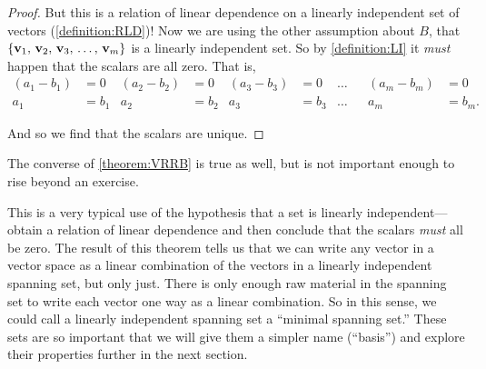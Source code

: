 \documentclass{ximera}
\begin{document}
\begin{theorem}
\begin{proof}
    But this is a relation of linear dependence on a linearly
    independent set of vectors (\ref{definition:RLD})! Now we are
    using the other assumption about $B$, that $\{\mathbf{v}_{1},\,\mathbf{v}_{2},\,\mathbf{v}_{3},\,\ldots,\,\mathbf{v}_{m}\}$
    is a linearly independent set.  So by \ref{definition:LI} it
    \textit{must} happen that the scalars are all zero.  That is,
    \begin{align*}
      (a_1-b_1)&=0&(a_2-b_2)&=0&(a_3-b_3)&=0&\ldots&&(a_m-b_m)&=0\\
      a_1&=b_1&a_2&=b_2&a_3&=b_3&\ldots&&a_m&=b_m.
    \end{align*}

    And so we find that the scalars are unique.
  \end{proof}
\end{theorem}

The converse of \ref{theorem:VRRB} is true as well, but is not
important enough to rise beyond an exercise.

This is a very typical use of the hypothesis that a set is linearly
independent---obtain a relation of linear dependence and then conclude
that the scalars \textit{must} all be zero.  The result of this
theorem tells us that we can write any vector in a vector space as a
linear combination of the vectors in a linearly independent spanning
set, but only just.  There is only enough raw material in the spanning
set to write each vector one way as a linear combination.  So in this
sense, we could call a linearly independent spanning set a ``minimal
spanning set.''  These sets are so important that we will give them a
simpler name (``basis'') and explore their properties further in the
next section.
\end{document}
